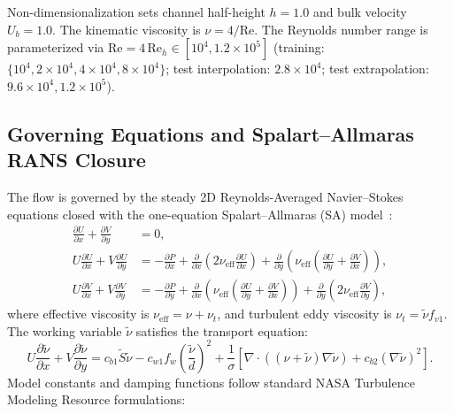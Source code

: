 \documentclass[11pt,a4paper]{article}
\begin{document}
Non-dimensionalization sets channel half-height $h = 1.0$ and bulk velocity $U_b = 1.0$. The kinematic viscosity is $\nu = 4/\mathrm{Re}$. The Reynolds number range is parameterized via $\mathrm{Re} = 4\,\mathrm{Re}_h \in [10^4, 1.2\times 10^5]$ (training: $\{10^4, 2\times 10^4, 4\times 10^4, 8\times 10^4\}$; test interpolation: $2.8\times 10^4$; test extrapolation: $9.6\times 10^4, 1.2\times 10^5$).

\subsection{Governing Equations and Spalart--Allmaras RANS Closure}
The flow is governed by the steady 2D Reynolds-Averaged Navier--Stokes equations closed with the one-equation Spalart--Allmaras (SA) model~\cite[Sec.~2.1, p.~2]{allmaras2012}:
\begin{align}
\label{eq:stage4_cont}
\frac{\partial U}{\partial x} + \frac{\partial V}{\partial y} &= 0, \\
\label{eq:stage4_mom_x}
U \frac{\partial U}{\partial x} + V \frac{\partial U}{\partial y} &= -\frac{\partial P}{\partial x} + \frac{\partial}{\partial x}\left(2\nu_{\mathrm{eff}}\frac{\partial U}{\partial x}\right) + \frac{\partial}{\partial y}\left(\nu_{\mathrm{eff}}\left(\frac{\partial U}{\partial y} + \frac{\partial V}{\partial x}\right)\right), \\
\label{eq:stage4_mom_y}
U \frac{\partial V}{\partial x} + V \frac{\partial V}{\partial y} &= -\frac{\partial P}{\partial y} + \frac{\partial}{\partial x}\left(\nu_{\mathrm{eff}}\left(\frac{\partial U}{\partial y} + \frac{\partial V}{\partial x}\right)\right) + \frac{\partial}{\partial y}\left(2\nu_{\mathrm{eff}}\frac{\partial V}{\partial y}\right),
\end{align}
where effective viscosity is $\nu_{\mathrm{eff}} = \nu + \nu_t$, and turbulent eddy viscosity is $\nu_t = \tilde{\nu} f_{v1}$.
The working variable $\tilde{\nu}$ satisfies the transport equation:
\begin{equation}
\label{eq:stage4_sa}
U \frac{\partial \tilde{\nu}}{\partial x} + V \frac{\partial \tilde{\nu}}{\partial y} = c_{b1} \tilde{S} \tilde{\nu} - c_{w1} f_w \left(\frac{\tilde{\nu}}{d}\right)^2 + \frac{1}{\sigma}\left[ \nabla \cdot ((\nu + \tilde{\nu})\nabla \tilde{\nu}) + c_{b2} (\nabla \tilde{\nu})^2 \right].
\end{equation}
Model constants and damping functions follow standard NASA Turbulence Modeling Resource formulations:
\end{document}
